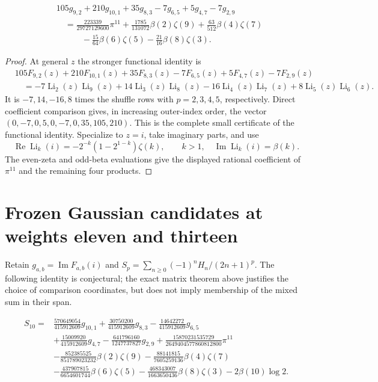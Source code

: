 \begin{corollary}
\begin{align*}
 &105g_{9,2}+210g_{10,1}+35g_{8,3}-7g_{6,5}+5g_{4,7}-7g_{2,9}\\
 &\quad=\frac{223339}{29727129600}\pi^{11}
 +\frac{1785}{131072}\beta(2)\zeta(9)
 +\frac{63}{512}\beta(4)\zeta(7)\\
 &\qquad\quad-\frac{15}{64}\beta(6)\zeta(5)
 -\frac{21}{16}\beta(8)\zeta(3).
\end{align*}
\end{corollary}
\begin{proof}
At general $z$ the stronger functional identity is
\begin{align*}
 &105F_{9,2}(z)+210F_{10,1}(z)+35F_{8,3}(z)
       -7F_{6,5}(z)+5F_{4,7}(z)-7F_{2,9}(z)\\
 &\quad=-7\operatorname{Li}_2(z)\operatorname{Li}_9(z)
       +14\operatorname{Li}_3(z)\operatorname{Li}_8(z)
       -16\operatorname{Li}_4(z)\operatorname{Li}_7(z)
       +8\operatorname{Li}_5(z)\operatorname{Li}_6(z).
\end{align*}
It is $-7,14,-16,8$ times the shuffle rows with $p=2,3,4,5$,
respectively.  Direct coefficient comparison gives, in increasing
outer-index order, the vector
$(0,-7,0,5,0,-7,0,35,105,210)$.  This is the complete small
certificate of the functional identity.  Specialize to $z=i$, take
imaginary parts, and use
\[
 \operatorname{Re}\operatorname{Li}_k(i)
 =-2^{-k}(1-2^{1-k})\zeta(k),\qquad k>1,
 \quad
 \operatorname{Im}\operatorname{Li}_k(i)=\beta(k).
\]
The even-zeta and odd-beta evaluations give the displayed rational
coefficient of $\pi^{11}$ and the remaining four products.
\end{proof}

\section{Frozen Gaussian candidates at weights eleven and thirteen}
\label{sec:candidates}

Retain $g_{a,b}=\operatorname{Im}F_{a,b}(i)$ and
$S_p=\sum_{n\geq0}(-1)^nH_n/(2n+1)^p$.
The following identity is conjectural; the exact matrix theorem above
justifies the choice of comparison coordinates, but does not imply
membership of the mixed sum in their span.

\begin{conjecture}\label{conj:S10}
\begin{align*}
 S_{10}={}&\frac{570649054}{415912609}g_{10,1}
 +\frac{30750200}{415912609}g_{8,3}
 -\frac{14642272}{415912609}g_{6,5}\\
 &+\frac{15009920}{415912609}g_{4,7}
 -\frac{641796160}{1247737827}g_{2,9}
 +\frac{15870231535729}{2649404577860812800}\pi^{11}\\
 &-\frac{852385525}{851789023232}\beta(2)\zeta(9)
 -\frac{88141815}{7605259136}\beta(4)\zeta(7)\\
 &-\frac{437907815}{6654601744}\beta(6)\zeta(5)
 -\frac{468343007}{1663650436}\beta(8)\zeta(3)
 -2\beta(10)\log2.
\end{align*}
\end{conjecture}

